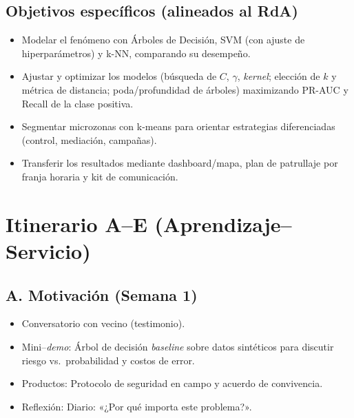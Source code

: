 \documentclass[a4,11pt]{aleph-notas}
\begin{document}
\subsection*{Objetivos específicos (alineados al RdA)}
\begin{itemize}
    \item Modelar el fenómeno con {Árboles de Decisión}, {SVM} (con ajuste de hiperparámetros) y {k-NN}, comparando su desempeño.
    \item Ajustar y optimizar los modelos (búsqueda de \(C\), \(\gamma\), \emph{kernel}; elección de \(k\) y métrica de distancia; poda/profundidad de árboles) maximizando {PR-AUC} y {Recall} de la clase positiva.
    \item Segmentar {microzonas} con {k-means} para orientar estrategias diferenciadas (control, mediación, campañas).
    \item Transferir los resultados mediante {dashboard/mapa}, {plan de patrullaje por franja horaria} y {kit de comunicación}.
\end{itemize}

\section{Itinerario A--E (Aprendizaje--Servicio)}

\subsection*{A. Motivación (Semana 1)}
\begin{itemize}
    \item Conversatorio con vecino (testimonio).
    \item Mini--\emph{demo}: Árbol de decisión \emph{baseline} sobre datos sintéticos para discutir riesgo vs.\ probabilidad y costos de error.
    \item {Productos:} Protocolo de seguridad en campo y acuerdo de convivencia.
    \item {Reflexión:} Diario: «¿Por qué importa este problema?».
\end{itemize}
\end{document}
